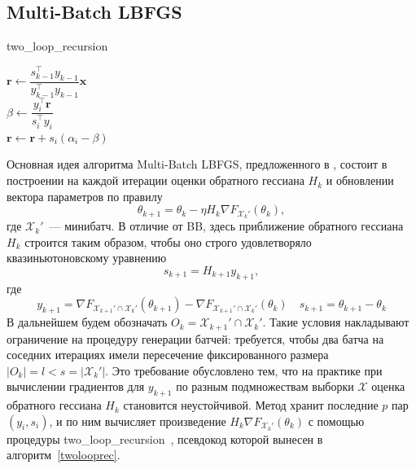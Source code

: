 \documentclass[preprint,12pt]{elsarticle}
\begin{document}
\subsection{Multi-Batch LBFGS}
\begin{algorithm}[H]\label{twolooprec}
\caption {two\_loop\_recursion}
\SetAlgoLined
{}
 $\mathbf{r} \leftarrow \dfrac{s_{k-1}^\top y_{k-1}}{y_{k-1}^\top y_{k-1}}\mathbf{x}$\\
  {
    $\beta \leftarrow \dfrac{y_i^\top \mathbf{r}}{s_i^\top y_i}$\\
    $\mathbf{r} \leftarrow \mathbf{r} + s_i(\alpha_i - \beta)$\\
 }
\end{algorithm}
Основная идея алгоритма Multi-Batch LBFGS, предложенного в \cite{multibatchLBFGS}, состоит в построении на каждой итерации оценки обратного гессиана $H_k$ и обновлении вектора параметров по правилу
\[ 
    \theta_{k+1} = \theta_k - \eta H_k \nabla F_{\mathcal{X}_k'}(\theta_k),
\]
где $\mathcal{X}_k'$~--- минибатч. 
В отличие от BB, здесь приближение обратного гессиана $H_k$ строится таким образом, чтобы оно строго удовлетворяло квазиньютоновскому уравнению
\[s_{k+1} = H_{k+1}y_{k+1},\]
где
\[y_{k+1} = \nabla F_{\mathcal{X}_{k+1}' \cap \mathcal{X}_k'}(\theta_{k+1}) - \nabla F_{\mathcal{X}_{k+1}' \cap \mathcal{X}_k'}(\theta_k) \quad s_{k+1} = \theta_{k+1} - \theta_k\]
В дальнейшем будем обозначать $O_k = \mathcal{X}_{k+1}' \cap \mathcal{X}_k'$. 
Такие условия накладывают ограничение на процедуру генерации батчей: требуется, чтобы два батча на соседних итерациях имели пересечение фиксированного размера $|O_k| = l < s = |\mathcal{X}_k'|$. 
Это требование обусловлено тем, что на практике при вычислении градиентов для $y_{k+1}$ по разным подмножествам выборки $\mathcal{X}$ оценка обратного гессиана $H_k$ становится неустойчивой. 
Метод хранит последние $p$ пар $(y_i, s_i)$, и по ним вычисляет произведение $H_k \nabla F_{\mathcal{X}_k'}(\theta_k)$ с помощью процедуры two\_loop\_recursion~\cite{numopt}, псевдокод которой вынесен в алгоритм~\ref{twolooprec}. 
\end{document}
